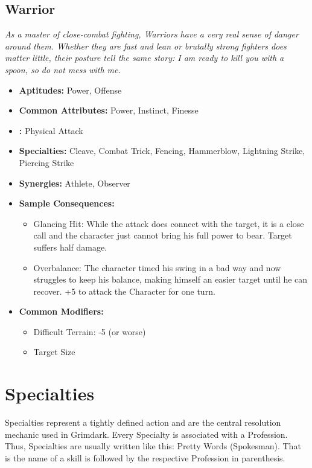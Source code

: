 \subsection{Warrior}\label{Warrior}
\textit{As a master of close-combat fighting, Warriors have a very real sense of danger around them.
Whether they are fast and lean or brutally strong fighters does matter little, their posture tell the same story: 
I am ready to kill you with a spoon, so do not mess with me.}
\begin{itemize}
	\item \textbf{Aptitudes:} Power, Offense
	\item \textbf{Common Attributes:} Power, Instinct, Finesse 
	\item \textbf{:} Physical Attack
	\item \textbf{Specialties:} Cleave, Combat Trick, Fencing, Hammerblow, Lightning Strike, Piercing Strike
	\item \textbf{Synergies:} Athlete, Observer
	\item \textbf{Sample Consequences:} 
	\begin{itemize}
		\item Glancing Hit: While the attack does connect with the target, it is a close call and the character just cannot bring his full power to bear. Target suffers half damage.
		\item Overbalance: The character timed his swing in a bad way and now struggles to keep his balance, making himself an easier target until he can recover. +5 to attack the Character for one turn.
	\end{itemize}
	\item \textbf{Common Modifiers:}
	\begin{itemize}
		\item Difficult Terrain: -5 (or worse)
		\item Target Size
	\end{itemize}
\end{itemize}


\section{Specialties}%
\label{sec:Specialties}
Specialties represent a tightly defined action and are the central resolution mechanic used in Grimdark. 
Every Specialty is associated with a Profession.
Thus, Specialties are usually written like this: Pretty Words (Spokesman).
That is the name of a skill is followed by the respective Profession in parenthesis.

